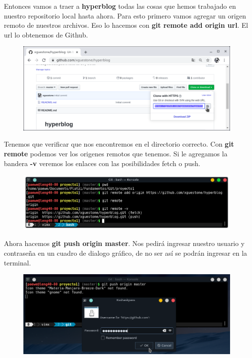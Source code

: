 \documentclass{article}
\begin{document}
Entonces vamos a traer a \textbf{hyperblog} todas las cosas que hemos trabajado
en nuestro repositorio local hasta ahora. Para esto primero vamos agregar un
origen remoto de nuestros archivos. Eso lo hacemos con \textbf{git remote add
origin url}. El url lo obtenemos de Github.\\

\newpage

\begin{figure}[h!]
  \centering
  \includegraphics[scale=0.75]{./Pictures/188_clonar_github.png}
\end{figure}

Tenemos que verificar que nos encontremos en el directorio correcto. Con
\textbf{git remote} podemos ver los origenes remotos que tenemos. Si le
agregamos la bandera \textbf{-v} veremos los enlaces con las posibilidades
fetch o push.

\begin{figure}[h!]
  \centering
  \includegraphics[scale=0.75]{./Pictures/189_remote_add.png}
\end{figure}

Ahora hacemos \textbf{git push origin master}. Nos pedirá ingresar nuestro
usuario y contraseña en un cuadro de dialogo gráfico, de no ser así se podrán
ingresar en la terminal.

\begin{figure}[h!]
  \centering
  \includegraphics[scale=0.75]{./Pictures/190_push_origin_master.png}
\end{figure}
\end{document}

